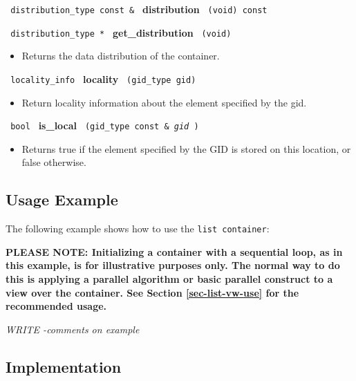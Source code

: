 \noindent
\texttt{%
distribution\_type const \& 
}
\textbf{distribution}%
\texttt{%
 (void) const
}
 
\noindent
\texttt{%
distribution\_type *
}
\textbf{get\_distribution}%
\texttt{%
(void)
}
 
\begin{itemize}
\item
Returns the data distribution of the container.
\end{itemize}

\noindent
\texttt{%
locality\_info 
}
\textbf{locality}%
\texttt{%
 (gid\_type gid)
}

\begin{itemize}
\item
Return locality information about the element specified by the gid. 
\end{itemize}
 
\noindent
\texttt{%
bool
}
\textbf{is\_local}%
\texttt{%
(gid\_type const \&
\textit{gid}%
)
}

\begin{itemize}
\item
Returns true if the element specified by the GID is stored on this location, or false otherwise. 
\end{itemize}

\subsection{Usage Example} \label{sec-list-cont-use}

The following example shows how to use the \texttt{list container}:


\textbf{PLEASE NOTE: 
Initializing a container with a sequential loop, as in this example,
is for illustrative purposes only.
The normal way to do this is applying a parallel algorithm or 
basic parallel construct to a view over the container.  See Section
\ref{sec-list-vw-use}
for the recommended usage.
}

\vspace{0.4cm} \textit{WRITE -comments on example}

\subsection{Implementation} \label{sec-list-cont-impl}

